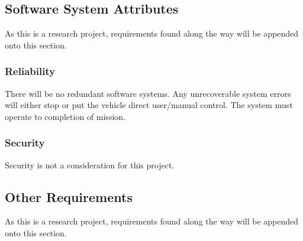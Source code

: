 \documentclass[compsoc,draftclsnofoot,onecolumn,10pt]{IEEEtran}
\begin{document}
\subsection{Software System Attributes}
As this is a research project, requirements found along the way will be appended onto this section. 

\subsubsection{Reliability}
There will be no redundant software systems. 
Any unrecoverable system errors will either stop or put the vehicle direct user/manual control.
The system must operate to completion of mission.

\subsubsection{Security}
Security is not a consideration for this project. 

\subsection{Other Requirements}
As this is a research project, requirements found along the way will be appended onto this section. 








\end{document}
